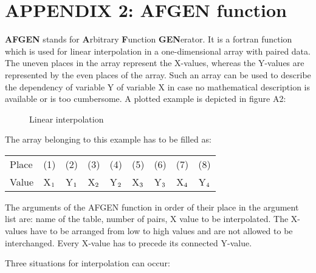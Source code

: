 \chapter{APPENDIX 2: AFGEN function} 
\label{app:AFGEN}

{\bf AFGEN} stands for {\bf A}rbitrary {\bf F}unction {\bf GEN}erator. It is a fortran function 
which is used for
linear interpolation in a one-dimensional array with paired data. The uneven places in the
array represent the X-values, whereas the Y-values are represented by the even places of the
array. Such an array can be used to describe the dependency of variable Y of variable X in
case no mathematical description is available or is too cumbersome. A plotted example is
depicted in figure A2:

\begin{figure}[htbp]
 \centering
 \caption{Linear interpolation}
 \label{fig:afgen}    
\end{figure}

The array belonging to this example has to be filled as:\\

\begin{center}
\begin{tabular}{lcccccccc}
Place & (1)& (2)& (3)& (4)& (5)& (6)& (7)& (8)\\
Value & X$_{{\rm 1}}$ & Y$_{{\rm 1}}$   & X$_{{\rm 2}}$& Y$_{{\rm 2}}$   & X$_{{\rm 3}}$ & Y$_{{\rm 3}}$   & X$_{{\rm 4}}$ & Y$_{{\rm 4}}$\\
\end{tabular}
\end{center}

The arguments of the AFGEN function in order of their place in the argument list are: name
of the table, number of pairs, X value to be interpolated. The X-values have to be arranged
from low to high values and are not allowed to be interchanged. Every X-value has to
precede its connected Y-value.

Three situations for interpolation can occur:

